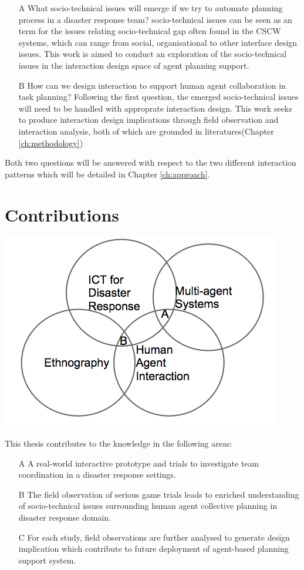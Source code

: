 \begin{enumerate}
\item[A] What socio-technical issues will emerge if we try to automate planning process in a disaster response team? socio-technical issues can be seen as an term for the issues relating socio-technical gap often found in the CSCW systems, which can range from social, organisational to other interface design issues. This work is aimed to conduct an exploration of the socio-technical issues in the interaction design space of agent planning support.

\item[B] How can we design interaction to support human agent collaboration in task planning?
Following the first question, the emerged socio-technical issues will need to be handled with approprate interaction design. This work seeks to produce interaction design implications through field observation and interaction analysis, both of which are grounded in literatures(Chapter \ref{ch:methodology})
\end{enumerate}

Both two questions will be answered with respect to the two different interaction patterns which will be detailed in Chapter \ref{ch:approach}. 

\section{Contributions} 
\includegraphics[scale=0.5]{img/contributions.png}

This thesis contributes to the knowledge in the following areas: \\
\begin{enumerate}
  \item[A] A real-world interactive prototype and trials to investigate team coordination in a disaster response settings.
  \item[B] The field observation of serious game trials leads to enriched understanding of socio-technical issues surrounding human agent collective planning in disaster response domain.
  \item[C] For each study, field observations are further analysed to generate design implication which contribute to future deployment of agent-based planning support system. 
\end{enumerate}


